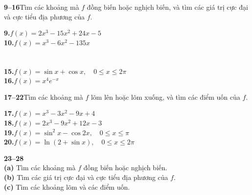 \noindent
\begin{minipage}[t]{0.485\textwidth}
    {\color{stewartcyan}\textbf{9--16}}\enspace Tìm các khoảng mà $f$ đồng biến hoặc nghịch biến, và tìm các giá trị cực đại và cực tiểu địa phương của $f$.
    \vspace{3pt}

    \textbf{9.}\enspace $f(x) = 2x^3 - 15x^2 + 24x - 5$\\[3pt]
    \textbf{10.}\enspace $f(x) = x^3 - 6x^2 - 135x$\\[3pt]
    \\[5pt]
    \\[4pt]
    \textbf{15.}\enspace $f(x) = \sin x + \cos x, \quad 0 \le x \le 2\pi$\\[3pt]
    \textbf{16.}\enspace $f(x) = x^4 e^{-x}$

    \exercisedivider

    {\color{stewartcyan}\textbf{17--22}}\enspace Tìm các khoảng mà $f$ lõm lên hoặc lõm xuống, và tìm các điểm uốn của $f$.
    \vspace{3pt}

    \textbf{17.}\enspace $f(x) = x^3 - 3x^2 - 9x + 4$\\[3pt]
    \textbf{18.}\enspace $f(x) = 2x^3 - 9x^2 + 12x - 3$\\[3pt]
    \textbf{19.}\enspace $f(x) = \sin^2 x - \cos 2x, \quad 0 \le x \le \pi$\\[3pt]
    \textbf{20.}\enspace $f(x) = \ln(2 + \sin x), \quad 0 \le x \le 2\pi$\\[4pt]

    \exercisedivider

    {\color{stewartcyan}\textbf{23--28}}\\[2pt]
    \textbf{(a)} Tìm các khoảng mà $f$ đồng biến hoặc nghịch biến.\\
    \textbf{(b)} Tìm các giá trị cực đại và cực tiểu địa phương của $f$.\\
    \textbf{(c)} Tìm các khoảng lõm và các điểm uốn.
    \vspace{3pt}


\end{minipage}
